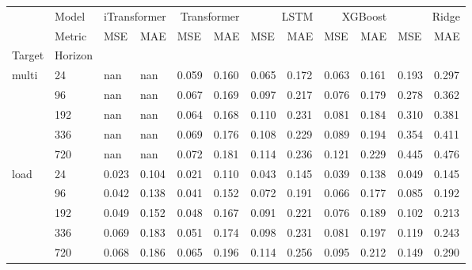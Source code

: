 \begin{tabular}{llllllllllll}
\toprule
 & Model & \multicolumn{2}{r}{iTransformer} & \multicolumn{2}{r}{Transformer} & \multicolumn{2}{r}{LSTM} & \multicolumn{2}{r}{XGBoost} & \multicolumn{2}{r}{Ridge} \\
 & Metric & MSE & MAE & MSE & MAE & MSE & MAE & MSE & MAE & MSE & MAE \\
Target & Horizon &  &  &  &  &  &  &  &  &  &  \\
\midrule
\multirow[t]{5}{*}{multi} & 24 & nan & nan & 0.059 & 0.160 & 0.065 & 0.172 & 0.063 & 0.161 & 0.193 & 0.297 \\
 & 96 & nan & nan & 0.067 & 0.169 & 0.097 & 0.217 & 0.076 & 0.179 & 0.278 & 0.362 \\
 & 192 & nan & nan & 0.064 & 0.168 & 0.110 & 0.231 & 0.081 & 0.184 & 0.310 & 0.381 \\
 & 336 & nan & nan & 0.069 & 0.176 & 0.108 & 0.229 & 0.089 & 0.194 & 0.354 & 0.411 \\
 & 720 & nan & nan & 0.072 & 0.181 & 0.114 & 0.236 & 0.121 & 0.229 & 0.445 & 0.476 \\
\cline{1-12}
\multirow[t]{5}{*}{load} & 24 & 0.023 & 0.104 & 0.021 & 0.110 & 0.043 & 0.145 & 0.039 & 0.138 & 0.049 & 0.145 \\
 & 96 & 0.042 & 0.138 & 0.041 & 0.152 & 0.072 & 0.191 & 0.066 & 0.177 & 0.085 & 0.192 \\
 & 192 & 0.049 & 0.152 & 0.048 & 0.167 & 0.091 & 0.221 & 0.076 & 0.189 & 0.102 & 0.213 \\
 & 336 & 0.069 & 0.183 & 0.051 & 0.174 & 0.098 & 0.231 & 0.081 & 0.197 & 0.119 & 0.243 \\
 & 720 & 0.068 & 0.186 & 0.065 & 0.196 & 0.114 & 0.256 & 0.095 & 0.212 & 0.149 & 0.290 \\
\cline{1-12}
\bottomrule
\end{tabular}
